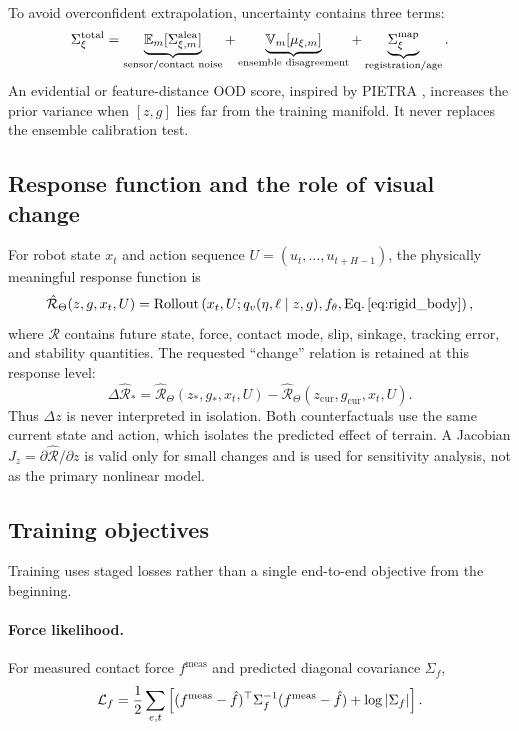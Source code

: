 To avoid overconfident extrapolation, uncertainty contains three terms:
\begin{equation}
\Sigma_\xi^{\mathrm{total}}=
\underbrace{\mathbb{E}_m[\Sigma_{\xi,m}^{\mathrm{alea}}]}_{\text{sensor/contact noise}}
+\underbrace{\mathbb{V}_m[\mu_{\xi,m}]}_{\text{ensemble disagreement}}
+\underbrace{\Sigma_\xi^{\mathrm{map}}}_{\text{registration/age}}.
\label{eq:uncertainty_decomp}
\end{equation}
An evidential or feature-distance OOD score, inspired by PIETRA \citep{cai2024pietra}, increases the prior variance when $[z,g]$ lies far from the training manifold. It never replaces the ensemble calibration test.

\subsection{Response function and the role of visual change}

For robot state $x_t$ and action sequence $U=(u_t,\ldots,u_{t+H-1})$, the physically meaningful response function is
\begin{equation}
\hat{\mathcal R}_\Theta(z,g,x_t,U)=
\operatorname{Rollout}\left(x_t,U; q_v(\eta,\ell\mid z,g),f_\theta,\text{Eq.}\,\eqref{eq:rigid_body}\right),
\label{eq:response_function}
\end{equation}
where $\mathcal R$ contains future state, force, contact mode, slip, sinkage, tracking error, and stability quantities. The requested ``change'' relation is retained at this response level:
\begin{equation}
\Delta\hat{\mathcal R}_*=
\hat{\mathcal R}_\Theta(z_*,g_*,x_t,U)
-\hat{\mathcal R}_\Theta(z_{\mathrm{cur}},g_{\mathrm{cur}},x_t,U).
\label{eq:delta_response}
\end{equation}
Thus $\Delta z$ is never interpreted in isolation. Both counterfactuals use the same current state and action, which isolates the predicted effect of terrain. A Jacobian $J_z=\partial\hat{\mathcal R}/\partial z$ is valid only for small changes and is used for sensitivity analysis, not as the primary nonlinear model.

\subsection{Training objectives}

Training uses staged losses rather than a single end-to-end objective from the beginning.

\paragraph{Force likelihood.}
For measured contact force $f^{\mathrm{meas}}$ and predicted diagonal covariance $\Sigma_f$,
\begin{equation}
\mathcal{L}_f=\frac{1}{2}\sum_{e,t}
\left[(f^{\mathrm{meas}}-\hat f)^\top\Sigma_f^{-1}(f^{\mathrm{meas}}-\hat f)
+\log|\Sigma_f|\right].
\label{eq:force_nll}
\end{equation}

